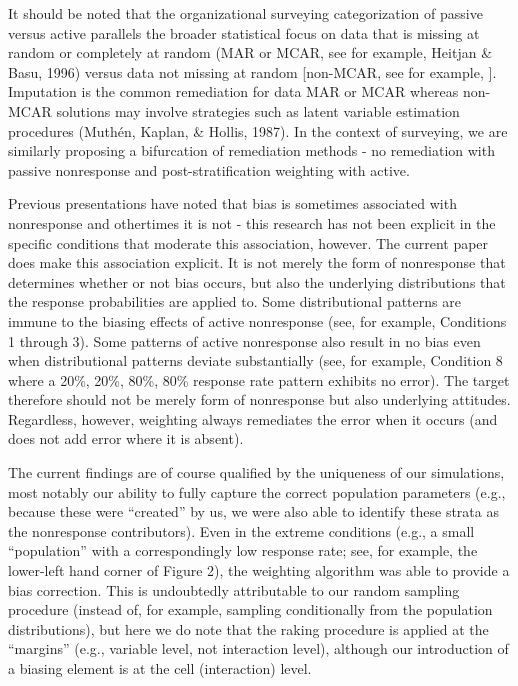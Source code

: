 \documentclass[
  ,man,floatsintext]{apa6}
\begin{document}
It should be noted that the organizational surveying categorization of passive versus active parallels the broader statistical focus on data that is missing at random or completely at random (MAR or MCAR, see for example, Heitjan \& Basu, 1996) versus data not missing at random {[}non-MCAR, see for example, {]}. Imputation is the common remediation for data MAR or MCAR whereas non-MCAR solutions may involve strategies such as latent variable estimation procedures (Muthén, Kaplan, \& Hollis, 1987). In the context of surveying, we are similarly proposing a bifurcation of remediation methods - no remediation with passive nonresponse and post-stratification weighting with active.

Previous presentations have noted that bias is sometimes associated with nonresponse and othertimes it is not - this research has not been explicit in the specific conditions that moderate this association, however. The current paper does make this association explicit. It is not merely the form of nonresponse that determines whether or not bias occurs, but also the underlying distributions that the response probabilities are applied to. Some distributional patterns are immune to the biasing effects of active nonresponse (see, for example, Conditions 1 through 3). Some patterns of active nonresponse also result in no bias even when distributional patterns deviate substantially (see, for example, Condition 8 where a 20\%, 20\%, 80\%, 80\% response rate pattern exhibits no error). The target therefore should not be merely form of nonresponse but also underlying attitudes. Regardless, however, weighting always remediates the error when it occurs (and does not add error where it is absent).

The current findings are of course qualified by the uniqueness of our simulations, most notably our ability to fully capture the correct population parameters (e.g., because these were ``created'' by us, we were also able to identify these strata as the nonresponse contributors). Even in the extreme conditions (e.g., a small ``population'' with a correspondingly low response rate; see, for example, the lower-left hand corner of Figure 2), the weighting algorithm was able to provide a bias correction. This is undoubtedly attributable to our random sampling procedure (instead of, for example, sampling conditionally from the population distributions), but here we do note that the raking procedure is applied at the ``margins'' (e.g., variable level, not interaction level), although our introduction of a biasing element is at the cell (interaction) level.
\end{document}
